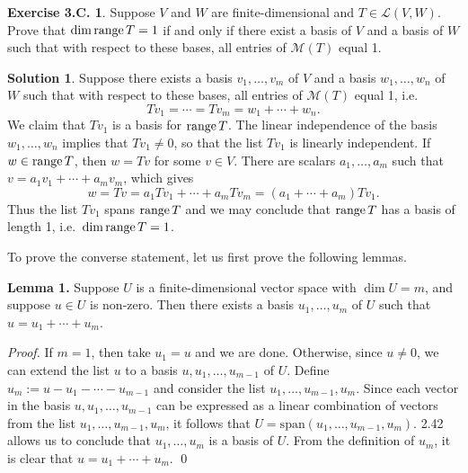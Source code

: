 \documentclass[12pt]{article}
\theoremstyle{definition}
\theoremstyle{exercise}
\newtheorem{exercise}{Exercise 3.C.}
\theoremstyle{solution}
\newtheorem*{solution}{Solution}
\newcommand{\lmap}{\mathcal{L}}
\newcommand{\mat}{\mathcal{M}}
\newcommand{\Span}{\text{span}}
\newcommand{\Range}{\text{range\,}}
\begin{document}
\begin{exercise}
\label{ex:6}
    Suppose \( V \) and \( W \) are finite-dimensional and \( T \in \lmap(V, W) \). Prove that \( \dim \Range T = 1 \) if and only if there exist a basis of \( V \) and a basis of \( W \) such that with respect to these bases, all entries of \( \mat(T) \) equal 1.
\end{exercise}

\begin{solution}
    Suppose there exists a basis \( v_1, \ldots, v_m \) of \( V \) and a basis \( w_1, \ldots, w_n \) of \( W \) such that with respect to these bases, all entries of \( \mat(T) \) equal 1, i.e.\
    \[
        Tv_1 = \cdots = Tv_m = w_1 + \cdots + w_n.
    \]
    We claim that \( Tv_1 \) is a basis for \( \Range T \). The linear independence of the basis \( w_1, \ldots, w_n \) implies that \( Tv_1 \neq 0 \), so that the list \( Tv_1 \) is linearly independent. If \( w \in \Range T \), then \( w = Tv \) for some \( v \in V \). There are scalars \( a_1, \ldots, a_m \) such that \( v = a_1 v_1 + \cdots + a_m v_m \), which gives
    \[
        w = Tv = a_1 Tv_1 + \cdots + a_m Tv_m = (a_1 + \cdots + a_m) Tv_1.
    \]
    Thus the list \( Tv_1 \) spans \( \Range T \) and we may conclude that \( \Range T \) has a basis of length 1, i.e.\ \( \dim \Range T = 1 \).

    To prove the converse statement, let us first prove the following lemmas.

    \vspace{2mm}

    \noindent \textbf{Lemma 1.} Suppose \( U \) is a finite-dimensional vector space with \( \dim U = m \), and suppose \( u \in U \) is non-zero. Then there exists a basis \( u_1, \ldots, u_m \) of \( U \) such that \( u = u_1 + \cdots + u_m \).

    \vspace{2mm}

    \noindent \textit{Proof.} If \( m = 1 \), then take \( u_1 = u \) and we are done. Otherwise, since \( u \neq 0 \), we can extend the list \( u \) to a basis \( u, u_1, \ldots, u_{m-1} \) of \( U \). Define \( u_m := u - u_1 - \cdots - u_{m-1} \) and consider the list \( u_1, \ldots, u_{m-1}, u_m \). Since each vector in the basis \( u, u_1, \ldots, u_{m-1} \) can be expressed as a linear combination of vectors from the list \( u_1, \ldots, u_{m-1}, u_m \), it follows that \( U = \Span(u_1, \ldots, u_{m-1}, u_m) \). 2.42 allows us to conclude that \( u_1, \ldots, u_m \) is a basis of \( U \). From the definition of \( u_m \), it is clear that \( u = u_1 + \cdots + u_m \). \qed


\end{solution}
\end{document}
